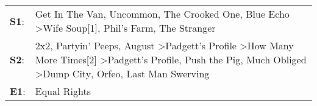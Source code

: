 \begin{supertabular}{p{0.03\textwidth}p{0.92\textwidth}}
 \textbf{S1}:  &                                                                                                                                                                                                               Get In The Van\textsuperscript{}, \enspace Uncommon\textsuperscript{}, \enspace The Crooked One\textsuperscript{}, \enspace Blue Echo\textsuperscript{} \textgreater \enspace Wife Soup[1]\textsuperscript{}, \enspace Phil's Farm\textsuperscript{}, \enspace The Stranger\textsuperscript{}  \enspace  \\
 \textbf{S2}:  &  2x2\textsuperscript{}, \enspace Partyin' Peeps\textsuperscript{}, \enspace August\textsuperscript{} \textgreater \enspace Padgett's Profile\textsuperscript{} \textgreater \enspace How Many More Times[2]\textsuperscript{} \textgreater \enspace Padgett's Profile\textsuperscript{}, \enspace Push the Pig\textsuperscript{}, \enspace Much Obliged\textsuperscript{} \textgreater \enspace Dump City\textsuperscript{}, \enspace Orfeo\textsuperscript{}, \enspace Last Man Swerving\textsuperscript{}  \enspace  \\
 \textbf{E1}:  &                                                                                                                                                                                                                                                                                                                                                                                                                                                                              Equal Rights\textsuperscript{}  \enspace  \\
\end{supertabular}
